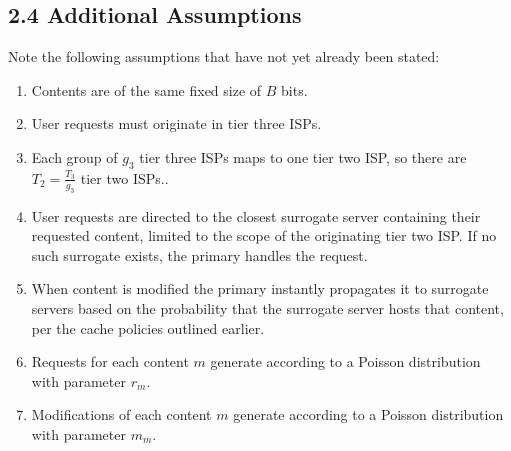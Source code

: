 \documentclass[
	a4paper, %
	10pt, %
	unnumberedsections, %
	twoside, %
]{LTJournalArticle}
\begin{document}
\subsection{2.4  Additional Assumptions}
Note the following assumptions that have not yet already been stated:
\begin{enumerate}
    \item Contents are of the same fixed size of $B$ bits.
    \item User requests must originate in tier three ISPs.
    \item Each group of $g_3$ tier three ISPs maps to one tier two ISP, so there are $T_2=\frac{T_3}{g_3}$ tier two ISPs..
    \item User requests are directed to the closest surrogate server containing their requested content, limited to the scope of the originating tier two ISP. If no such surrogate exists, the primary handles the request.
    \item When content is modified the primary instantly propagates it to surrogate servers based on the probability that the surrogate server hosts that content, per the cache policies outlined earlier.
    \item Requests for each content $m$ generate according to a Poisson distribution with parameter $r_m$.
    \item Modifications of each content $m$ generate according to a Poisson distribution with parameter $m_m$.
\end{enumerate}
\end{document}
